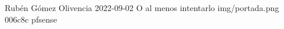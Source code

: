 \documentclass{\ClassPath/yukibook}
\begin{document}
    {Rubén Gómez Olivencia}  %
    {2022-09-02}    %
    {} %
    {O al menos intentarlo} %
    {} %
    {img/portada.png} %
    {006c8c}
    {pfsense} %

    \coverpage
    \graphicspath{{../../yukibook.cls/}}
    \licensepage

    \tableofcontents

    \graphicspath{{img/doc/}}
    
\end{document}
